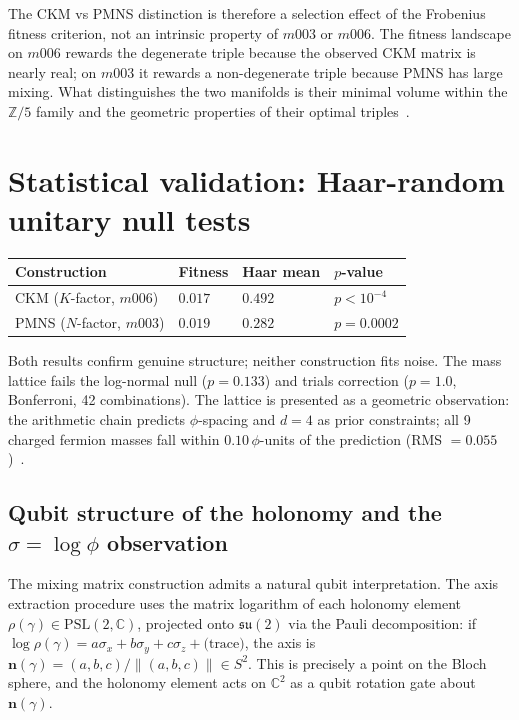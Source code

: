 \documentclass[12pt]{article}
\theoremstyle{definition}
\begin{document}
The CKM vs PMNS distinction is therefore a selection effect of the Frobenius fitness criterion, not an intrinsic property of $m003$ or $m006$. The fitness landscape on $m006$ rewards the degenerate triple because the observed CKM matrix is nearly real; on $m003$ it rewards a non-degenerate triple because PMNS has large mixing. What distinguishes the two manifolds is their minimal volume within the $\mathbb{Z}/5$ family and the geometric properties of their optimal triples~\cite{Gentry:Scan}.
\section{Statistical validation: Haar-random unitary null tests}
\label{sec:haar}

\begin{center}\small
\begin{tabular}{llll}
\toprule
Construction & Fitness & Haar mean & $p$-value\\
\midrule
CKM ($K$-factor, $m006$) & $0.017$ & $0.492$ & $p<10^{-4}$\\
PMNS ($N$-factor, $m003$) & $0.019$ & $0.282$ & $p=0.0002$\\
\bottomrule
\end{tabular}
\end{center}

Both results confirm genuine structure; neither construction fits noise.
The mass lattice fails the log-normal null ($p=0.133$) and trials
correction ($p=1.0$, Bonferroni, 42 combinations). The lattice is
presented as a geometric observation: the arithmetic chain predicts
$\phi$-spacing and $d=4$ as prior constraints; all 9 charged fermion
masses fall within $0.10\,\phi$-units of the prediction
(RMS $=0.055$)~\cite{Gentry:Scan}.


\subsection{Qubit structure of the holonomy and the $\sigma = \log\phi$ observation}
\label{subsec:qubit}

The mixing matrix construction admits a natural qubit interpretation.
The axis extraction procedure uses the matrix logarithm of each holonomy
element $\rho(\gamma)\in\mathrm{PSL}(2,\mathbb{C})$, projected onto
$\mathfrak{su}(2)$ via the Pauli decomposition: if
$\log\rho(\gamma) = a\sigma_x + b\sigma_y + c\sigma_z + \text{(trace)}$,
the axis is $\mathbf{n}(\gamma)=(a,b,c)/\|(a,b,c)\|\in S^2$.
This is precisely a point on the Bloch sphere, and the holonomy element
acts on $\mathbb{C}^2$ as a qubit rotation gate about $\mathbf{n}(\gamma)$.
\end{document}
